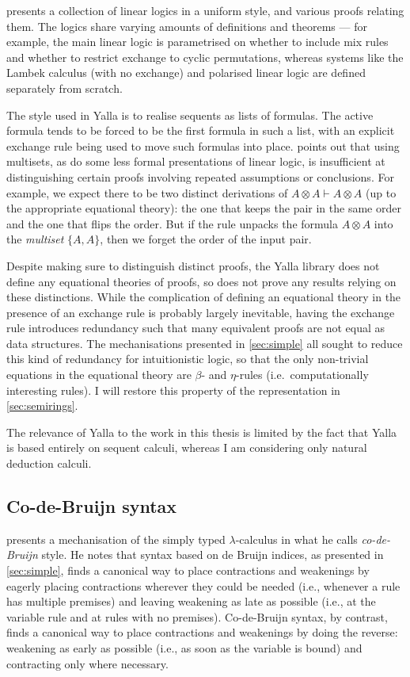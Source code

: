  presents a collection of linear logics in a uniform style, and
various proofs relating them.
The logics share varying amounts of definitions and theorems --- for example,
the main linear logic is parametrised on whether to include mix rules and
whether to restrict exchange to cyclic permutations, whereas systems like the
Lambek calculus (with no exchange) and polarised linear logic are defined
separately from scratch.

The style used in Yalla is to realise sequents as lists of formulas.
The active formula tends to be forced to be the first formula in such a list,
with an explicit exchange rule being used to move such formulas into place.
 points out that using multisets, as do some less formal
presentations of linear logic, is insufficient at distinguishing certain proofs
involving repeated assumptions or conclusions.
For example, we expect there to be two distinct derivations of
$A \otimes A \vdash A \otimes A$ (up to the appropriate equational theory):
the one that keeps the pair in the same order and the one that flips the order.
But if the  rule unpacks the formula $A \otimes A$ into the
\emph{multiset} $\{A, A\}$, then we forget the order of the input pair.

Despite making sure to distinguish distinct proofs, the Yalla library does not
define any equational theories of proofs, so does not prove any results relying
on these distinctions.
While the complication of defining an equational theory in the presence of an
exchange rule is probably largely inevitable, having the exchange rule
introduces redundancy such that many equivalent proofs are not equal as data
structures.
The mechanisations presented in \cref{sec:simple} all sought to reduce this kind
of redundancy for intuitionistic logic, so that the only non-trivial equations
in the equational theory are $\beta$- and $\eta$-rules (i.e.\ computationally
interesting rules).
I will restore this property of the representation in \cref{sec:semirings}.

The relevance of Yalla to the work in this thesis is limited by the fact that
Yalla is based entirely on sequent calculi, whereas I am considering only
natural deduction calculi.

\subsection{Co-de-Bruijn syntax}

 presents a mechanisation of the simply typed
$\lambda$-calculus in what he calls \emph{co-de-Bruijn} style.
He notes that syntax based on de Bruijn indices, as presented in
\cref{sec:simple}, finds a canonical way to place contractions and weakenings
by eagerly placing contractions wherever they could be needed (i.e., whenever a
rule has multiple premises) and leaving weakening as late as possible (i.e., at
the variable rule and at rules with no premises).
Co-de-Bruijn syntax, by contrast, finds a canonical way to place contractions
and weakenings by doing the reverse: weakening as early as possible (i.e., as
soon as the variable is bound) and contracting only where necessary.

